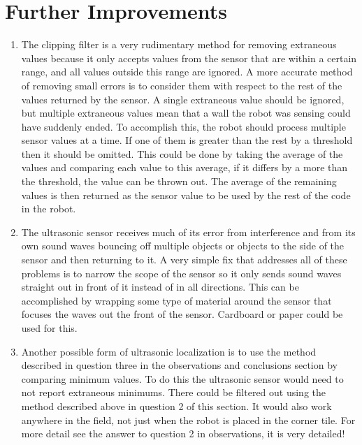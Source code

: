 \documentclass[twocolumn]{article}
\begin{document}
\section{Further Improvements}

\begin{enumerate}

\item
The clipping filter is a very rudimentary method for removing extraneous values because it only accepts values from the sensor that are within a certain range, and all values outside this range are ignored. A more accurate method of removing small errors is to consider them with respect to the rest of the values returned by the sensor. A single extraneous value should be ignored, but multiple extraneous values mean that a wall the robot was sensing could have suddenly ended. To accomplish this, the robot should process multiple sensor values at a time. If one of them is greater than the rest by a threshold then it should be omitted. This could be done by taking the average of the values and comparing each value to this average, if it differs by a more than the threshold, the value can be thrown out. The average of the remaining values is then returned as the sensor value to be used by the rest of the code in the robot.

\item
The ultrasonic sensor receives much of its error from interference and from its own sound waves bouncing off multiple objects or objects to the side of the sensor and then returning to it. A very simple fix that addresses all of these problems is to narrow the scope of the sensor so it only sends sound waves straight out in front of it instead of in all directions. This can be accomplished by wrapping some type of material around the sensor that focuses the waves out the front of the sensor. Cardboard or paper could be used for this.

\item Another possible form of ultrasonic localization is to use the method described in question three in the observations and conclusions section by comparing minimum values. To do this the ultrasonic sensor would need to not report extraneous minimums. There could be filtered out using the method described above in question 2 of this section. It would also work anywhere in the field, not just when the robot is placed in the corner tile. For more detail see the answer to question 2 in observations, it is very detailed!

\end{enumerate}


\end{document}
